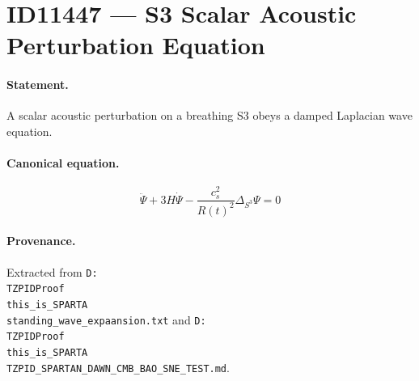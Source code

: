 \section*{ID11447 --- S3 Scalar Acoustic Perturbation Equation}

\paragraph{Statement.}
A scalar acoustic perturbation on a breathing S3 obeys a damped Laplacian wave equation.

\paragraph{Canonical equation.}
\[
\ddot\Psi+3H\dot\Psi-\frac{c_s^2}{R(t)^2}\Delta_{S^3}\Psi=0
\]

\paragraph{Provenance.}
Extracted from \texttt{D:\\TZPIDProof\\this\_is\_SPARTA\\standing\_wave\_expaansion.txt} and \texttt{D:\\TZPIDProof\\this\_is\_SPARTA\\TZPID\_SPARTAN\_DAWN\_CMB\_BAO\_SNE\_TEST.md}.
